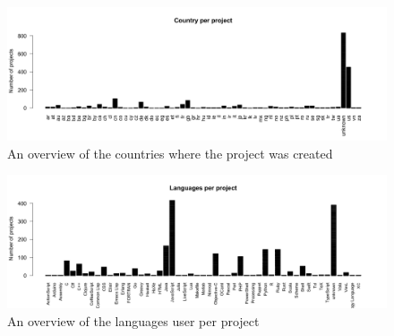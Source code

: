 	    \begin{figure}[t!]
	        \includegraphics[width=500pt]{figures/country-per-project}
	        \caption{An overview of the countries where the project was created}
	        \label{fig:country-plot}
	    \end{figure}

	    \begin{figure}[t!]
	        \includegraphics[width=500pt]{figures/languages-per-project}
	        \caption{An overview of the languages user per project}
	        \label{fig:language-frequency-plot}
	    \end{figure}
    
